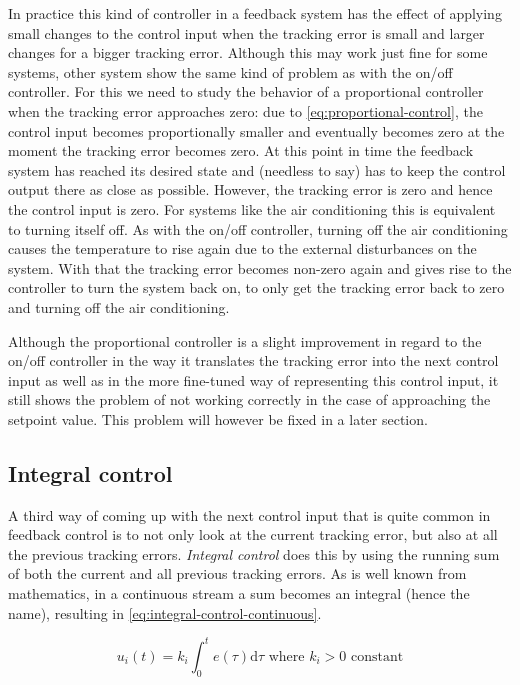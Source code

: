 In practice this kind of controller in a feedback system has the effect of applying small changes to the control input when the tracking error is small and larger changes for a bigger tracking error. Although this may work just fine for some systems, other system show the same kind of problem as with the on/off controller. For this we need to study the behavior of a proportional controller when the tracking error approaches zero: due to \autoref{eq:proportional-control}, the control input becomes proportionally smaller and eventually becomes zero at the moment the tracking error becomes zero. At this point in time the feedback system has reached its desired state and (needless to say) has to keep the control output there as close as possible. However, the tracking error is zero and hence the control input is zero. For systems like the air conditioning this is equivalent to turning itself off. As with the on/off controller, turning off the air conditioning causes the temperature to rise again due to the external disturbances on the system. With that the tracking error becomes non-zero again and gives rise to the controller to turn the system back on, to only get the tracking error back to zero and turning off the air conditioning.

Although the proportional controller is a slight improvement in regard to the on/off controller in the way it translates the tracking error into the next control input as well as in the more fine-tuned way of representing this control input, it still shows the problem of not working correctly in the case of approaching the setpoint value. This problem will however be fixed in a later section.

\subsection{Integral control}
A third way of coming up with the next control input that is quite common in feedback control is to not only look at the current tracking error, but also at all the previous tracking errors. \textit{Integral control} does this by using the running sum of both the current and all previous tracking errors. As is well known from mathematics, in a continuous stream a sum becomes an integral (hence the name), resulting in \autoref{eq:integral-control-continuous}.

\begin{equation}\label{eq:integral-control-continuous}
u_i(t) = k_i \int_{0}^{t}e(\tau) \mathrm{d} \tau \text{\ \ \ \ where } k_i > 0 \text{ constant}
\end{equation}

